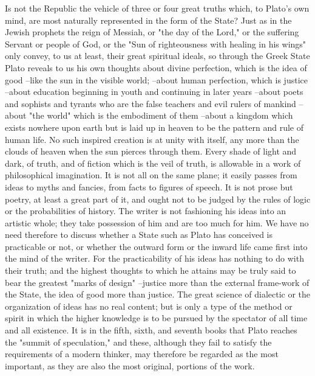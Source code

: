 Is not the Republic the vehicle of three or four great truths which, to Plato's own mind, are most naturally represented in the form of the State? Just as in the Jewish prophets the reign of Messiah, or "the day of the Lord," or the suffering Servant or people of God, or the "Sun of righteousness with healing in his wings" only convey, to us at least, their great spiritual ideals, so through the Greek State Plato reveals to us his own thoughts about divine perfection, which is the idea of good --like the sun in the visible world; --about human perfection, which is justice --about education beginning in youth and continuing in later years --about poets and sophists and tyrants who are the false teachers and evil rulers of mankind --about "the world" which is the embodiment of them --about a kingdom which exists nowhere upon earth but is laid up in heaven to be the pattern and rule of human life. No such inspired creation is at unity with itself, any more than the clouds of heaven when the sun pierces through them. Every shade of light and dark, of truth, and of fiction which is the veil of truth, is allowable in a work of philosophical imagination. It is not all on the same plane; it easily passes from ideas to myths and fancies, from facts to figures of speech. It is not prose but poetry, at least a great part of it, and ought not to be judged by the rules of logic or the probabilities of history. The writer is not fashioning his ideas into an artistic whole; they take possession of him and are too much for him. We have no need therefore to discuss whether a State such as Plato has conceived is practicable or not, or whether the outward form or the inward life came first into the mind of the writer. For the practicability of his ideas has nothing to do with their truth; and the highest thoughts to which he attains may be truly said to bear the greatest "marks of design" --justice more than the external frame-work of the State, the idea of good more than justice. The great science of dialectic or the organization of ideas has no real content; but is only a type of the method or spirit in which the higher knowledge is to be pursued by the spectator of all time and all existence. It is in the fifth, sixth, and seventh books that Plato reaches the "summit of speculation," and these, although they fail to satisfy the requirements of a modern thinker, may therefore be regarded as the most important, as they are also the most original, portions of the work.

